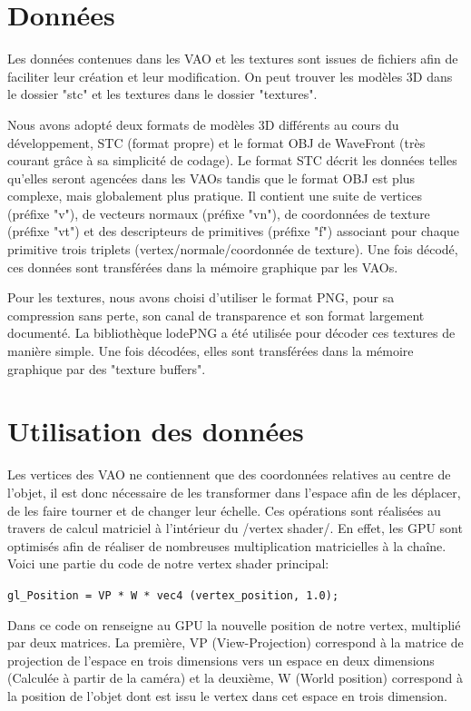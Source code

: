\section{Données}
Les données contenues dans les VAO et les textures sont issues de fichiers afin de faciliter leur création et leur modification. On peut trouver les modèles 3D dans le dossier "stc" et les textures dans le dossier "textures".

Nous avons adopté deux formats de modèles 3D différents au cours du développement, STC (format propre) et le format OBJ de WaveFront (très courant grâce à sa simplicité de codage). Le format STC décrit les données telles qu'elles seront agencées dans les VAOs tandis que le format OBJ est plus complexe, mais globalement plus pratique. Il contient une suite de vertices (préfixe "v"), de vecteurs normaux (préfixe "vn"), de coordonnées de texture (préfixe "vt") et des descripteurs de primitives (préfixe "f") associant pour chaque primitive trois triplets (vertex/normale/coordonnée de texture). Une fois décodé, ces données sont transférées dans la mémoire graphique par les VAOs.

Pour les textures, nous avons choisi d'utiliser le format PNG, pour sa compression sans perte, son canal de transparence et son format largement documenté. La bibliothèque lodePNG a été utilisée pour décoder ces textures de manière simple. Une fois décodées, elles sont transférées dans la mémoire graphique par des "texture buffers".

\section{Utilisation des données}
Les vertices des VAO ne contiennent que des coordonnées relatives au centre de l'objet, il est donc nécessaire de les transformer dans l'espace afin de les déplacer, de les faire tourner et de changer leur échelle. Ces opérations sont réalisées au travers de calcul matriciel à l'intérieur du /vertex shader/. En effet, les GPU sont optimisés afin de réaliser de nombreuses multiplication matricielles à la chaîne. Voici une partie du code de notre vertex shader principal:\newline

\verb|gl_Position = VP * W * vec4 (vertex_position, 1.0);|\newline

Dans ce code on renseigne au GPU la nouvelle position de notre vertex, multiplié par deux matrices. La première, VP (View-Projection) correspond à la matrice de projection de l'espace en trois dimensions vers un espace en deux dimensions (Calculée à partir de la caméra) et la deuxième, W (World position) correspond à la position de l'objet dont est issu le vertex dans cet espace en trois dimension.

